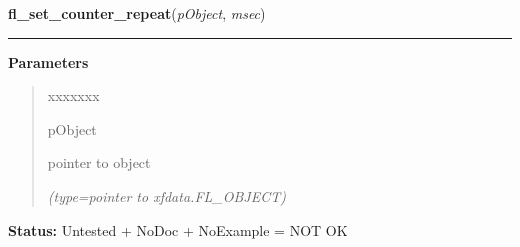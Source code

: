 \hspace{.8\funcindent}\begin{boxedminipage}{\funcwidth}

    \raggedright \textbf{fl\_set\_counter\_repeat}(\textit{pObject}, \textit{msec})

    \vspace{-1.5ex}

    \rule{\textwidth}{0.5\fboxrule}
\setlength{\parskip}{2ex}
\setlength{\parskip}{1ex}
      \textbf{Parameters}
      \vspace{-1ex}

      \begin{quote}
        \begin{Ventry}{xxxxxxx}

          \item[pObject]

          pointer to object

            {\it (type=pointer to xfdata.FL\_OBJECT)}

        \end{Ventry}

      \end{quote}

\textbf{Status:} Untested + NoDoc + NoExample = NOT OK



    \end{boxedminipage}

    \label{xformslib:library:fl_get_counter_min_repeat}

    \vspace{0.5ex}

